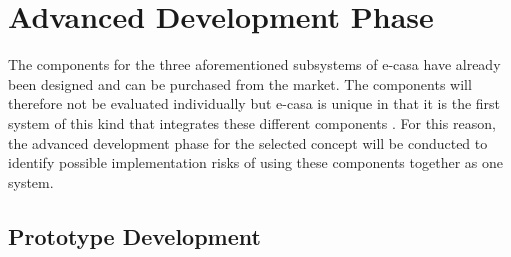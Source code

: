 \documentclass[a4paper,11pt,fleqn]{report}
\begin{document}
\section{Advanced Development Phase}
The components for the three aforementioned subsystems of \ac{e-casa} have already been designed and can be purchased from the market. The components will therefore not be evaluated individually but \ac{e-casa} is unique in that it is the first system of this kind that integrates these different components .
For this reason, the advanced development phase for the selected concept will be conducted to identify possible implementation risks of using these components together as one system.

\subsection{Prototype Development}
%
 \label{tb: Functional_SS_elements} 
\end{document}
